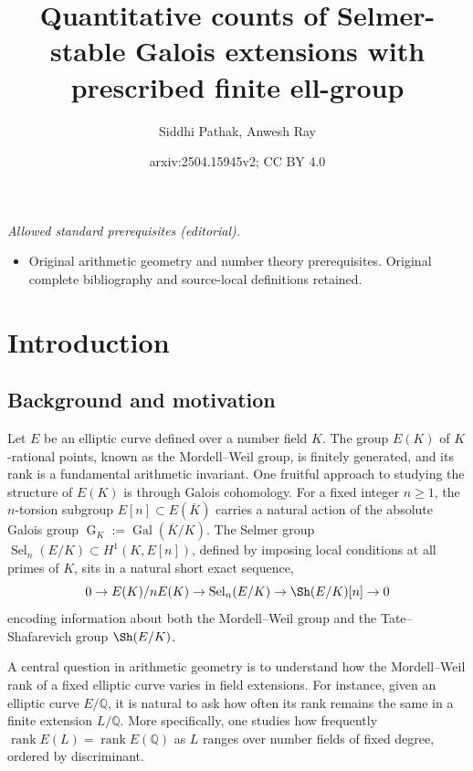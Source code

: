 \documentclass[11pt,reqno]{amsart}
\title{Quantitative counts of Selmer-stable Galois extensions with prescribed finite ell-group}
\author{Siddhi Pathak, Anwesh Ray}
\date{arxiv:2504.15945v2; CC BY 4.0}
\newcommand{\op}[1]{\operatorname{#1}}
\numberwithin{equation}{section}
\begin{document}
\maketitle
\noindent\textit{Allowed standard prerequisites (editorial).}\begin{itemize}
\item Original arithmetic geometry and number theory prerequisites. Original complete bibliography and source-local definitions retained.
\end{itemize}\medskip
\section{Introduction}
\label{section:intro}

\subsection{Background and motivation}
\par Let \( E \) be an elliptic curve defined over a number field \( K \). The group \( E(K) \) of \( K \)-rational points, known as the Mordell{--}Weil group, is finitely generated, and its rank is a fundamental arithmetic invariant. One fruitful approach to studying the structure of \( E(K) \) is through Galois cohomology. For a fixed integer \( n \geq 1 \), the \( n \)-torsion subgroup \( E[n] \subset E(\overline{K}) \) carries a natural action of the absolute Galois group \( \operatorname{G}_K := \operatorname{Gal}(\overline{K}/K) \). The Selmer group \( \operatorname{Sel}_n(E/K) \subset H^1(K, E[n]) \), defined by imposing local conditions at all primes of \( K \), sits in a natural short exact sequence,\[0\rightarrow E(K)/nE(K)\rightarrow \op{Sel}_n(E/K)\rightarrow \Sh(E/K)[n]\rightarrow 0\]
encoding information about both the Mordell{--}Weil group and the Tate{--}Shafarevich group \( \Sh(E/K) \).

\par A central question in arithmetic geometry is to understand how the Mordell{--}Weil rank of a fixed elliptic curve varies in field extensions. For instance, given an elliptic curve \( E/\mathbb{Q} \), it is natural to ask how often its rank remains the same in a finite extension \( L/\mathbb{Q} \). More specifically, one studies how frequently \( \operatorname{rank} E(L) = \operatorname{rank} E(\mathbb{Q}) \) as \( L \) ranges over number fields of fixed degree, ordered by discriminant. 
\end{document}
